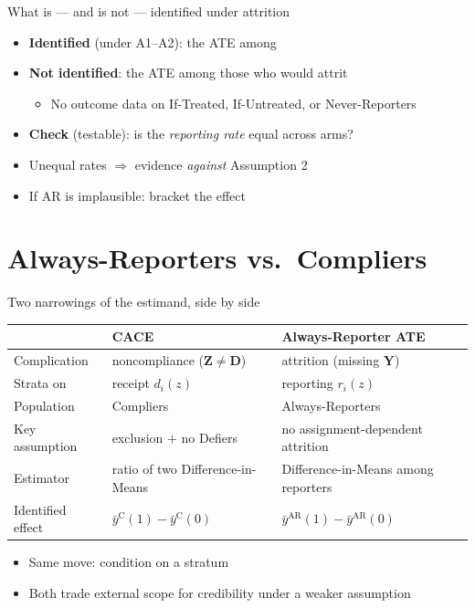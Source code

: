 \documentclass[table, xcolor = {dvipsnames}, 9pt]{beamer}
\theoremstyle{plain}
\newcommand{\mh}[1]{{\color{magenta}{#1}}}
\begin{document}
\begin{frame}[t]{What is --- and is not --- identified under attrition}
\vfill
\begin{itemize} \vfill
\item \textbf{Identified} (under A1--A2): the ATE among \mh{Always-Reporters} \vfill
\item \textbf{Not identified}: the ATE among those who would attrit \vfill
\begin{itemize} \vfill
\item No outcome data on If-Treated, If-Untreated, or Never-Reporters \vfill
\end{itemize} \vfill
\item \textbf{Check} (testable): is the \emph{reporting rate} equal across arms? \vfill
\item[] Unequal rates $\Rightarrow$ evidence \emph{against} Assumption 2 \vfill
\item If AR is implausible: \mh{trimming bounds} bracket the effect \citep{lee2009} \vfill
\end{itemize} \vfill
\end{frame}
\section{Always-Reporters vs.\ Compliers}

\begin{frame}[t]{Two narrowings of the estimand, side by side}
\vfill
\small
\begin{table}[H]
\centering
\begin{tabular}{p{2.6cm}|p{3.4cm}|p{3.4cm}}
 & \textbf{CACE} & \textbf{Always-Reporter ATE} \\ \hline
Complication & noncompliance ($\bm{Z}\neq\bm{D}$) & attrition (missing $\bm{Y}$) \\ \hline
Strata on & receipt $d_i(z)$ & reporting $r_i(z)$ \\ \hline
Population & Compliers & Always-Reporters \\ \hline
Key assumption & exclusion $+$ no Defiers & no assignment-dependent attrition \\ \hline
Estimator & ratio of two Difference-in-Means & Difference-in-Means among reporters \\ \hline
Identified effect & $\bar{y}^{\textrm{C}}(1) - \bar{y}^{\textrm{C}}(0)$ & $\bar{y}^{\textrm{AR}}(1) - \bar{y}^{\textrm{AR}}(0)$ \\
\end{tabular}
\end{table}
\normalsize
\vfill
\begin{itemize} \vfill
\item Same move: condition on a \mh{fixed but latent} stratum \vfill
\item Both trade external scope for credibility under a weaker assumption \vfill
\end{itemize} \vfill
\end{frame}
\end{document}
